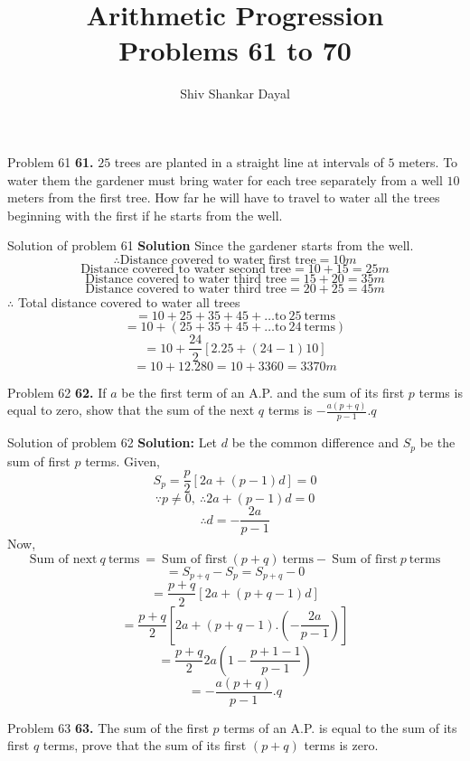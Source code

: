 \documentclass[aspectratio=1610,8pt]{beamer}
\title{Arithmetic Progression\\Problems 61 to 70}
\author[Shiv Shankar Dayal]{Shiv Shankar Dayal}
\begin{document}
\begin{frame}
       \titlepage
\end{frame}
\begin{frame}{Problem 61}
  \textbf{61.} $25$ trees are planted in a straight line at intervals of $5$
  meters. To water them the gardener must bring water for each tree
  separately from a well $10$ meters from the first tree. How far he will have
  to travel to water all the trees beginning with the first if he starts from
  the well.
\end{frame}
\begin{frame}{Solution of problem 61}
  \textbf{Solution} Since the gardener starts from the well.\\
  $$\therefore \text{Distance covered to water first tree} = 10m$$
  $$\text{Distance covered to water second tree} = 10 + 15 = 25m$$
  $$\text{Distance covered to water third tree} = 15 + 20 = 35m$$
  $$\text{Distance covered to water third tree} = 20 + 25 = 45m$$
  $\therefore$ Total distance covered to water all trees
  $$= 10 + 25 + 35 + 45 + \ldots \text{to}~25~\text{terms}$$
  $$= 10 + (25 + 35 + 45 + \ldots \text{to}~24~\text{terms})$$
  $$= 10 + \frac{24}{2}[2.25 + (24 - 1)10]$$
  $$= 10 + 12.280 = 10 + 3360 = 3370m$$
\end{frame}
\begin{frame}{Problem 62}
  \textbf{62.} If $a$ be the first term of an A.P. and the sum of its first $p$
  terms is equal to zero, show that the sum of the next $q$ terms is
  $-\frac{a(p + q)}{p - 1}.q$
\end{frame}
\begin{frame}{Solution of problem 62}
  \textbf{Solution:} Let $d$ be the common difference and $S_p$ be the sum of
  first $p$ terms. Given,
  $$S_p = \frac{p}{2}[2a + (p - 1)d] = 0$$
  $$\because p \ne 0,~\therefore 2a + (p - 1)d = 0$$
  $$\therefore d = -\frac{2a}{p - 1}$$
  Now,
  $$\text{Sum of next}~q~\text{terms}~=~\text{Sum of first}~(p +
  q)~\text{terms} -~\text{Sum of first}~p~\text{terms}$$
  $$= S_{p + q} - S_p = S_{p + q} - 0$$
  $$= \frac{p+q}{2}[2a + (p + q - 1)d]$$
  $$= \frac{p + q}{2}\left[2a + (p+q-1).\left(-\frac{2a}{p-1}\right)\right]$$
  $$= \frac{p + q}{2}2a\left(1 - \frac{p+1-1}{p -1}\right)$$
  $$= -\frac{a(p+q)}{p -1}.q$$
\end{frame}
\begin{frame}{Problem 63}
  \textbf{63.} The sum of the first $p$ terms of an A.P. is equal to the
  sum of its first $q$ terms, prove that the sum of its first $(p + q)$ terms
  is zero.
\end{frame}
\end{document}
